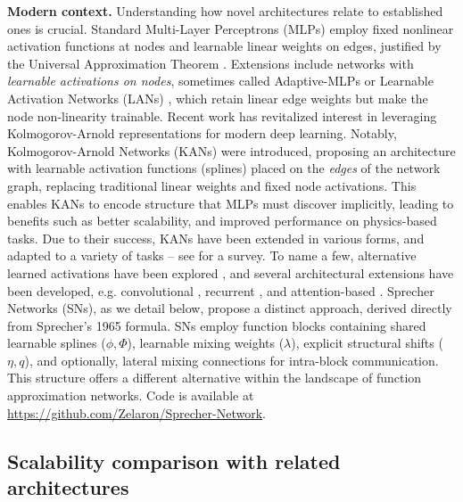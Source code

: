 \documentclass{article}
\theoremstyle{plain}
\theoremstyle{definition}
\theoremstyle{remark}
\begin{document}
\vspace{1mm}
\textbf{Modern context.} Understanding how novel architectures relate to established ones is crucial. Standard Multi-Layer Perceptrons (MLPs) \cite{haykin1994neural} employ fixed nonlinear activation functions at nodes and learnable linear weights on edges, justified by the Universal Approximation Theorem \cite{cybenko1989approximation, hornik1989multilayer}. Extensions include networks with \emph{learnable activations on nodes}, sometimes called Adaptive-MLPs or Learnable Activation Networks (LANs) \cite{goyal2019learning, zhang2022neural, liu2024kan}, which retain linear edge weights but make the node non-linearity trainable. Recent work has revitalized interest in leveraging Kolmogorov-Arnold representations for modern deep learning. Notably, Kolmogorov-Arnold Networks (KANs) \cite{liu2024kan} were introduced, proposing an architecture with learnable activation functions (splines) placed on the \emph{edges} of the network graph, replacing traditional linear weights and fixed node activations. This enables KANs to encode structure that MLPs must discover implicitly, leading to benefits such as better scalability, and improved performance on physics-based tasks. Due to their success, KANs have been extended in various forms, and adapted to a variety of tasks -- see \cite{somvanshi2025survey} for a survey. To name a few, alternative learned activations have been explored \cite{li2024kolmogorov, bozorgasl2405wav}, and several architectural extensions have been developed, e.g. convolutional \cite{bodner2024convolutional}, recurrent \cite{genet2024temporal}, and attention-based \cite{yang2024kolmogorov}. Sprecher Networks (SNs), as we detail below, propose a distinct approach, derived directly from Sprecher's 1965 formula. SNs employ function blocks containing shared learnable splines ($\phi, \Phi$), learnable mixing weights ($\lambda$), explicit structural shifts ($\eta, q$), and optionally, lateral mixing connections for intra-block communication. This structure offers a different alternative within the landscape of function approximation networks. Code is available at \url{https://github.com/Zelaron/Sprecher-Network}.

\subsection{Scalability comparison with related architectures}\label{sec:scalability}
\end{document}
